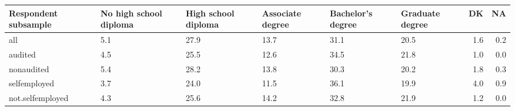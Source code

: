 \begin{table}[ht]
\centering
\begin{tabular}{lL{2cm}L{2cm}L{2cm}L{2cm}L{2cm}rr}
  \hline
Respondent subsample & No high school diploma & High school diploma & Associate degree & Bachelor's degree & Graduate degree & DK & NA \\ 
  \hline
all & 5.1 & 27.9 & 13.7 & 31.1 & 20.5 & 1.6 & 0.2 \\ 
  audited & 4.5 & 25.5 & 12.6 & 34.5 & 21.8 & 1.0 & 0.0 \\ 
  nonaudited & 5.4 & 28.2 & 13.8 & 30.3 & 20.2 & 1.8 & 0.3 \\ 
  selfemployed & 3.7 & 24.0 & 11.5 & 36.1 & 19.9 & 4.0 & 0.9 \\ 
  not.selfemployed & 4.3 & 25.6 & 14.2 & 32.8 & 21.9 & 1.2 & 0.0 \\ 
   \hline
\end{tabular}
\end{table}
